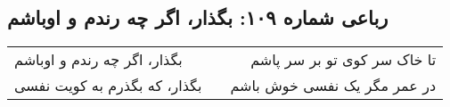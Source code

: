 \begin{center}
\section*{رباعی شماره ۱۰۹: بگذار، اگر چه رندم و اوباشم}
\label{sec:109}
\begin{longtable}{l p{0.5cm} r}
بگذار، اگر چه رندم و اوباشم
&&
تا خاک سر کوی تو بر سر پاشم
\\
بگذار، که بگذرم به کویت نفسی
&&
در عمر مگر یک نفسی خوش باشم
\\
\end{longtable}
\end{center}
